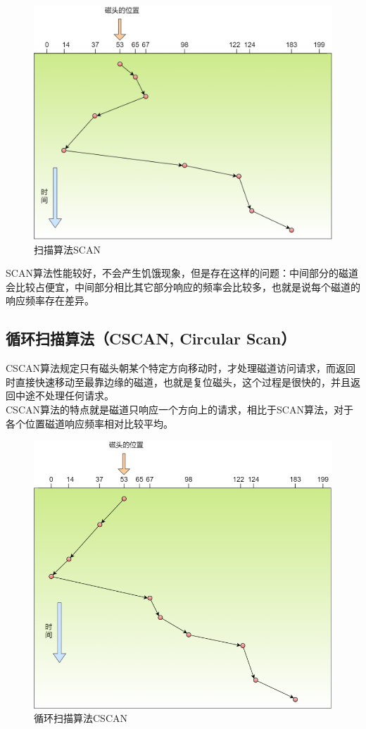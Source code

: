 \begin{figure}[H]
	\centering
	\includegraphics[scale=0.35]{img/C4/4-4/3.png}
	\caption{扫描算法SCAN}
\end{figure}

SCAN算法性能较好，不会产生饥饿现象，但是存在这样的问题：中间部分的磁道会比较占便宜，中间部分相比其它部分响应的频率会比较多，也就是说每个磁道的响应频率存在差异。

\subsection{循环扫描算法（CSCAN, Circular Scan）}

CSCAN算法规定只有磁头朝某个特定方向移动时，才处理磁道访问请求，而返回时直接快速移动至最靠边缘的磁道，也就是复位磁头，这个过程是很快的，并且返回中途不处理任何请求。 \\

CSCAN算法的特点就是磁道只响应一个方向上的请求，相比于SCAN算法，对于各个位置磁道响应频率相对比较平均。

\begin{figure}[H]
	\centering
	\includegraphics[scale=1.3]{img/C4/4-4/4.png}
	\caption{循环扫描算法CSCAN}
\end{figure}

